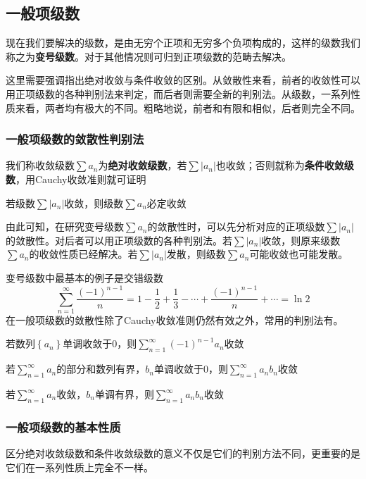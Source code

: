 \documentclass[lang=cn,10pt]{elegantbook}
\begin{document}
\subsection{一般项级数}
现在我们要解决的级数，是由无穷个正项和无穷多个负项构成的，这样的级数我们称之为\textbf{变号级数}。对于其他情况则可归到正项级数的范畴去解决。

这里需要强调指出绝对收敛与条件收敛的区别。从敛散性来看，前者的收敛性可以用正项级数的各种判别法来判定，而后者则需要全新的判别法。从级数，一系列性质来看，两者均有极大的不同。粗略地说，前者和有限和相似，后者则完全不同。
\subsubsection{一般项级数的敛散性判别法}
我们称收敛级数$\sum{a_n}$为\textbf{绝对收敛级数}，若$\sum{|a_n|}$也收敛；否则就称为\textbf{条件收敛级数}，用Cauchy收敛准则就可证明
\begin{proposition}
	若级数$\sum{|a_n|}$收敛，则级数$\sum{a_n}$必定收敛
\end{proposition}

由此可知，在研究变号级数$\sum{a_n}$的敛散性时，可以先分析对应的正项级数$\sum{|a_n|}$的敛散性。对后者可以用正项级数的各种判别法。若$\sum{|a_n|}$收敛，则原来级数$\sum{a_n}$的收敛性质已经解决。若$\sum{|a_n|}$发散，则级数$\sum{a_n}$可能收敛也可能发散。

变号级数中最基本的例子是交错级数
\begin{equation*}
	\sum_{n=1}^{\infty}{\frac{\left( -1 \right) ^{n-1}}{n}}=1-\frac{1}{2}+\frac{1}{3}-\cdots +\frac{\left( -1 \right) ^{n-1}}{n}+\cdots =\ln 2
\end{equation*}
在一般项级数的敛散性除了Cauchy收敛准则仍然有效之外，常用的判别法有。
\begin{proposition}[Leibniz判别法]
	若$\text{数列}\left\{ a_n \right\} \text{单调收敛于}0\text{，则}\sum_{n=1}^{\infty}{\left( -1 \right) ^{n-1}a_n}\text{收敛}$	
\end{proposition}
\begin{proposition}[Dirichlet判别法]
	若$\sum_{n=1}^{\infty}{a_n}\text{的部分和数列有界，}b_n\text{单调收敛于}0\text{，则}\sum_{n=1}^{\infty}{a_nb_n}\text{收敛}$	
\end{proposition}
\begin{proposition}[Abel判别法]
	若$\sum_{n=1}^{\infty}{a_n}\text{收敛，}b_n\text{单调有界，则}\sum_{n=1}^{\infty}{a_nb_n}\text{收敛}$
\end{proposition}
\subsubsection{一般项级数的基本性质}
区分绝对收敛级数和条件收敛级数的意义不仅是它们的判别方法不同，更重要的是它们在一系列性质上完全不一样。
\end{document}
